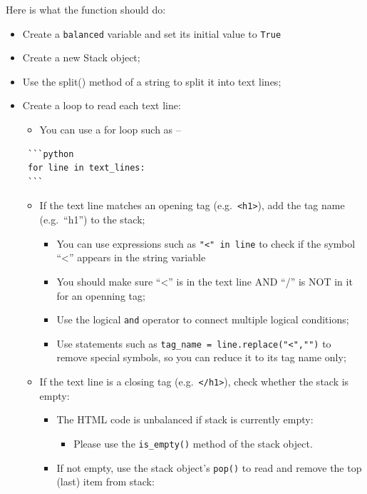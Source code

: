 \documentclass[
  letterpaper,
]{scrbook}
\providecommand{\tightlist}{%
  \setlength{\itemsep}{0pt}\setlength{\parskip}{0pt}}
\begin{document}
Here is what the function should do:

\begin{itemize}
\item
  Create a \texttt{balanced} variable and set its initial value to
  \texttt{True}
\item
  Create a new Stack object;
\item
  Use the split() method of a string to split it into text lines;
\item
  Create a loop to read each text line:

  \begin{itemize}
  \tightlist
  \item
    You can use a for loop such as --
  \end{itemize}

\begin{verbatim}
 ```python
 for line in text_lines:
 ```
\end{verbatim}

  \begin{itemize}
  \item
    If the text line matches an opening tag
    (e.g.~\texttt{\textless{}h1\textgreater{}}), add the tag name
    (e.g.~``h1'') to the stack;

    \begin{itemize}
    \item
      You can use expressions such as \texttt{"\textless{}"\ in\ line}
      to check if the symbol ``\textless{}'' appears in the string
      variable
    \item
      You should make sure ``\textless{}'' is in the text line AND ``/''
      is NOT in it for an openning tag;
    \item
      Use the logical \texttt{and} operator to connect multiple logical
      conditions;
    \item
      Use statements such as
      \texttt{tag\_name\ =\ line.replace("\textless{}","")} to remove
      special symbols, so you can reduce it to its tag name only;
    \end{itemize}
  \item
    If the text line is a closing tag
    (e.g.~\texttt{\textless{}/h1\textgreater{}}), check whether the
    stack is empty:

    \begin{itemize}
    \tightlist
    \item
      The HTML code is unbalanced if stack is currently empty:

      \begin{itemize}
      \tightlist
      \item
        Please use the \texttt{is\_empty()} method of the stack object.
      \end{itemize}
    \item
      If not empty, use the stack object's \texttt{pop()} to read and
      remove the top (last) item from stack:


\end{itemize}
\end{itemize}
\end{itemize}
\end{document}
